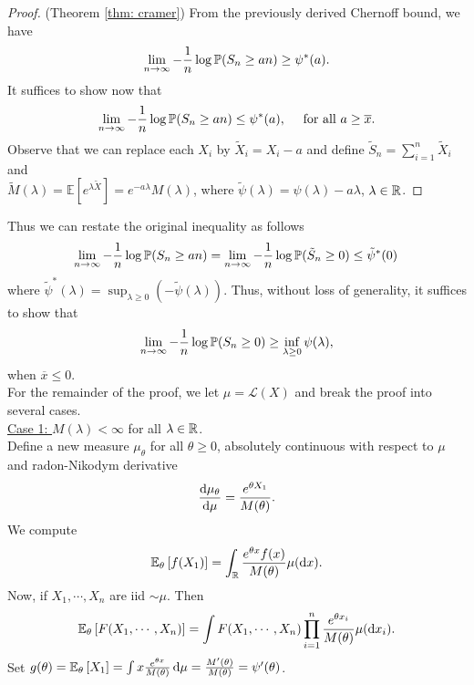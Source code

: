\documentclass{article}
\begin{document}
\begin{proof}{(Theorem \ref{thm: cramer})}
    From the previously derived Chernoff bound, we have 
    \[
    \lim_{n \to \infty} -\frac{1}{n}\log \mathbb{P}(S_{n}\geq an)\geq \psi^{*}(a).
    \]
    It suffices to show now that 
    \[
	    \lim_{n \to \infty} -\frac{1}{n}\log \mathbb{P}(S_{n}\geq an)\leq \psi^{*}(a), \quad \text{ for all }a\geq \overline{x}.
    \]
    Observe that we can replace each $ X_{i}$ by $ \tilde{X}_{i} = X_{i}-a$ and define $ \tilde{S}_{n} =\displaystyle\sum^{n }_{i=1}\tilde{X}_{i}$ and \\ 
    $ \tilde{M}(\lambda) = \mathbb{E}\left[ e^{\lambda \tilde{X}} \right] = e^{-a\lambda}M(\lambda)$, where $ \tilde{\psi}(\lambda) = \psi(\lambda)-a\lambda$, $ \lambda \in \mathbb{R}$. 
\end{proof}

Thus we can restate the original inequality as follows
\[
\lim_{n \to \infty} -\frac{1}{n}\log \mathbb{P}(S_{n}\geq an)= \lim_{n \to \infty} -\frac{1}{n}\log \mathbb{P}(\tilde{S}_{n}\geq 0)\leq \tilde{\psi}^{*}(0)\,
\]
where $ \tilde{\psi}^{*}(\lambda) = \displaystyle\sup_{\lambda \geq 0}(-\tilde{\psi}(\lambda))$. Thus, without loss of generality, it suffices to show that 
\[
 \lim_{n \to \infty} -\frac{1}{n}\log \mathbb{P}(S_{n}\geq 0)\geq \displaystyle\inf_{\lambda \geq 0}\psi(\lambda),
\]
when $ \overline{x}\leq 0$.\\ 


For the remainder of the proof, we let $ \mu = \mathcal{L}(X)$ and break the proof into several cases.\\ 

\underline{Case 1: } $ M(\lambda)<\infty$ for all $ \lambda \in \mathbb{R}$.\\ 

Define a new measure $ \mu_{\theta}$ for all $ \theta \geq 0$, absolutely continuous with respect to $ \mu$ and radon-Nikodym derivative 
\[
	\frac{\operatorname{d}\! \mu_{\theta}}{\operatorname{d}\!  \mu} = \frac{e^{\theta X_{1}}}{M(\theta)}.
\]
We compute
\[
 \mathbb{E}_{\theta}\left[ f(X_{1})\right] = \displaystyle\int_{\mathbb{R}} \frac{e^{\theta x}f(x)}{M(\theta)}\mu (\operatorname{d}\!  x).    
\]
Now, if $X_{1}, \cdots, X_{n}$ are iid $ \sim \mu$. Then 
\[
	\mathbb{E}_{\theta}\left[ F(X_{1}, \cdots, X_{n}) \right] = \displaystyle\int F(X_{1}, \cdots, X_{n}) \displaystyle\prod^{n}_{i=1}\frac{e^{\theta x_{i}}}{M(\theta)}\mu(\operatorname{d}\!  x_{i}).   
\]
Set $ g(\theta) = \mathbb{E}_{\theta}\left[ X_{1} \right] = \int x \frac{e^{\theta x}}{M(\theta)}\operatorname{d}\!  \mu = \frac{M'(\theta)}{M(\theta)} = \psi'(\theta)$.\\ 
\end{document}
